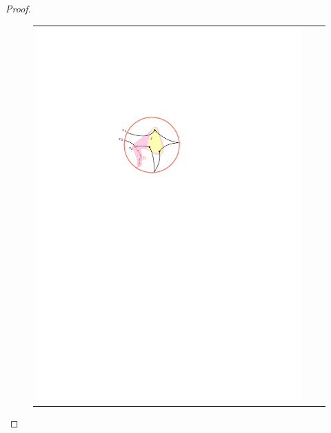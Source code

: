 \documentclass{patmorin}
\theoremstyle{plain}
\theoremstyle{definition}
\begin{document}
\begin{proof}
	\begin{figure}
		\begin{center}
			\begin{tabular}{c@{}c@{}c}
				\includegraphics{figs/zoomba-1} &

\end{tabular}
\end{center}
\end{figure}
\end{proof}
\end{document}
